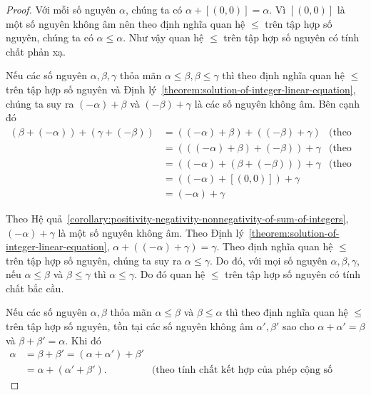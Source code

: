 \begin{proof}
    Với mỗi số nguyên $\alpha$, chúng ta có $\alpha + [(0,0)] = \alpha$. Vì $[(0,0)]$ là một số nguyên không âm nên theo định nghĩa quan hệ $\leq$ trên tập hợp số nguyên, chúng ta có $\alpha\leq \alpha$. Như vậy quan hệ $\leq$ trên tập hợp số nguyên có tính chất phản xạ.

    Nếu các số nguyên $\alpha, \beta, \gamma$ thỏa mãn $\alpha\leq \beta, \beta\leq\gamma$ thì theo định nghĩa quan hệ $\leq$ trên tập hợp số nguyên và Định lý~\ref{theorem:solution-of-integer-linear-equation}, chúng ta suy ra $(-\alpha) + \beta$ và $(-\beta) + \gamma$ là các số nguyên không âm. Bên cạnh đó
    \begin{align*}
        (\beta + (-\alpha)) + (\gamma + (-\beta)) & = ((-\alpha) + \beta) + ((-\beta) + \gamma) & \text{(theo tính chất giao hoán của phép cộng số nguyên)} \\
                                                  & = (((-\alpha) + \beta) + (-\beta)) + \gamma & \text{(theo tính chất kết hợp của phép cộng số nguyên)}   \\
                                                  & = ((-\alpha) + (\beta + (-\beta))) + \gamma & \text{(theo tính chất kết hợp của phép cộng số nguyên)}   \\
                                                  & = ((-\alpha) + [(0,0)]) + \gamma                                                                        \\
                                                  & = (-\alpha) + \gamma
    \end{align*}

    Theo Hệ quả~\ref{corollary:positivity-negativity-nonnegativity-of-sum-of-integers}, $(-\alpha) + \gamma$ là một số nguyên không âm. Theo Định lý~\ref{theorem:solution-of-integer-linear-equation}, $\alpha + ((-\alpha) + \gamma) = \gamma$. Theo định nghĩa quan hệ $\leq$ trên tập hợp số nguyên, chúng ta suy ra $\alpha\leq\gamma$. Do đó, với mọi số nguyên $\alpha,\beta,\gamma$, nếu $\alpha\leq\beta$ và $\beta\leq\gamma$ thì $\alpha\leq\gamma$. Do đó quan hệ $\leq$ trên tập hợp số nguyên có tính chất bắc cầu.

    Nếu các số nguyên $\alpha, \beta$ thỏa mãn $\alpha\leq\beta$ và $\beta\leq\alpha$ thì theo định nghĩa quan hệ $\leq$ trên tập hợp số nguyên, tồn tại các số nguyên không âm $\alpha', \beta'$ sao cho $\alpha + \alpha' = \beta$ và $\beta + \beta' = \alpha$. Khi đó
    \begin{align*}
        \alpha & = \beta + \beta' = (\alpha + \alpha') + \beta'                                                           \\
               & = \alpha + (\alpha' + \beta').                 & \text{(theo tính chất kết hợp của phép cộng số nguyên)}
    \end{align*}


\end{proof}

